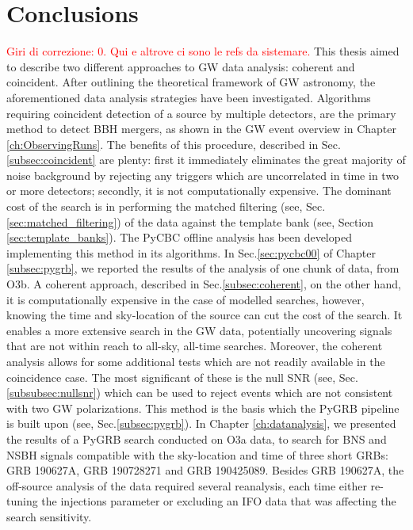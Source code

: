 \documentclass[binding=0.6cm, LaM]{sapthesis}
\newcommand{\fpg}[1]{\textcolor{red}{#1} }
\begin{document}
\chapter*{Conclusions}
\fpg{Giri di correzione: 0.}%
\fpg{Qui e altrove ci sono le refs da sistemare.}
This thesis aimed to describe two different approaches to GW data analysis: coherent and coincident.
	After outlining the theoretical framework of GW astronomy,
	the aforementioned data analysis strategies have been investigated. 
	Algorithms requiring coincident detection of a source by multiple detectors,
	are the primary method to detect BBH mergers, 
	as shown in the GW event overview in Chapter \ref{ch:ObservingRuns}.
	The benefits of this procedure, described in Sec.\ref{subsec:coincident} are plenty: 
	first it immediately eliminates the great majority of noise background 
	by rejecting any triggers which are uncorrelated in time in two or more detectors; 
	secondly, it is not computationally expensive. 
	The dominant cost of the search is in performing the matched filtering (see, Sec.\ref{sec:matched_filtering}) 
	of the data against the template bank (see, Section \ref{sec:template_banks}).
	The {\ttfamily PyCBC} offline analysis has been developed implementing this method in its algorithms. 
	In Sec.\ref{sec:pycbc00} of Chapter \ref{subsec:pygrb}, we reported the results of the analysis of one chunk of data,  from O3b.
	A coherent approach, described in Sec.\ref{subsec:coherent}, on the other hand, 
	it is computationally expensive in the case of modelled searches,
	however, knowing the time and sky-location of the source can cut the cost of the search.
	It enables a more extensive search in the GW data, potentially uncovering signals 
	that are not within reach to all-sky, all-time searches.
	Moreover, the coherent analysis allows for some additional tests 
	which are not readily available in the coincidence case. 
	The most significant of these is the null SNR (see, Sec.\ref{subsubsec:nullsnr}) which can be used to reject events which are 
	not consistent with two GW polarizations. 
	This method is the  basis which the  {\ttfamily PyGRB}  pipeline is built upon (see, Sec.\ref{subsec:pygrb}).
	In Chapter \ref{ch:datanalysis}, we presented the results of a {\ttfamily PyGRB} search conducted on O3a data,
	to search for BNS and NSBH signals compatible with the sky-location and time of three short GRBs:
	GRB 190627A, GRB 190728271 and GRB 190425089.
	Besides GRB 190627A, the off-source analysis of the data required several reanalysis,
	each time either re-tuning the injections parameter or excluding an IFO data that was affecting the search sensitivity.
\end{document}
